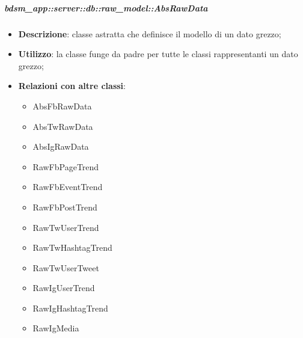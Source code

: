 		\subparagraph{bdsm\_app::server::db::raw\_model::AbsRawData} %
		\label{subp:bdsm_app_server_raw_model_absrawdata}
			\begin{itemize}
				\item \textbf{Descrizione}: classe astratta che definisce il modello di un dato grezzo;
				\item \textbf{Utilizzo}: la classe funge da padre per tutte le classi rappresentanti un dato grezzo;
				\item \textbf{Relazioni con altre classi}:
					\begin{itemize}
						\item AbsFbRawData
						\item AbsTwRawData
						\item AbsIgRawData
						\item RawFbPageTrend
						\item RawFbEventTrend
						\item RawFbPostTrend
						\item RawTwUserTrend
						\item RawTwHashtagTrend
						\item RawTwUserTweet
						\item RawIgUserTrend
						\item RawIgHashtagTrend
						\item RawIgMedia
					\end{itemize}
			\end{itemize}


